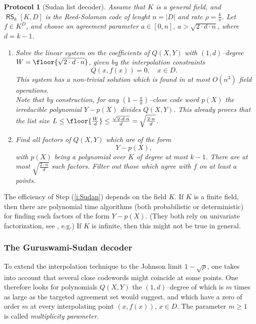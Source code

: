 \documentclass[11pt]{article}
\newtheorem{protocol}[]{Protocol}
\theoremstyle{definition}
\theoremstyle{remark}
\DeclareMathOperator{\RS}{\mathsf{RS}}
\begin{document}
\begin{protocol}[Sudan list decoder] 
Assume that $K$ is a general field, and $\RS_k[K,D]$ is the Reed-Solomon code of lenght $n=|D|$ and rate $\rho=\frac{k}{n}$. 
Let $f\in K^D$, and choose an agreement parameter $a\in [0,n]$,
$a>\sqrt{2\cdot d \cdot n}$, where $d= k-1$.
\begin{enumerate}
\item 
Solve the linear system on the coefficients of $Q(X,Y)$ with $(1,d)$--degree $W = \floor{\sqrt{2\cdot d\cdot n}}$, given by the interpolation constraints
\[
Q(x,f(x)) = 0, \quad x\in D.
\]
This system has a non-trivial solution which is found in at most $O(n^3)$ field operations.
\\
{\tiny
Note that by construction, for any $\left(1-\frac{a}{n}\right)$--close code word $p(X)$ the irreducible polynomial $Y-p(X)$ divides $Q(X,Y)$.
This already proves that the list size $L \leq \floor{\frac{W}{d}} \leq \frac{\sqrt{2\cdot d\cdot n}}{d} = \sqrt{\frac{2\cdot n}{d}}$.
}

\item 
\label{i:Sudan}
Find all factors of $Q(X,Y)$ which are of the form
\[
Y-p(X),
\] 
with $p(X)$ being a polynomial over $K$ of degree at most $k-1$. 
There are at most $\sqrt{\frac{2\cdot n}{d}}$ such factors. 
Filter out those which agree with $f$ on at least $a$ points. 
\end{enumerate}
\end{protocol}

The efficiency of Step (\ref{i:Sudan}) depends on the field $K$. 
If $K$ is a finite field, then there are polynomial time algorithms (both probabilistic or deterministic) for finding such factors of the form $Y-p(X)$. (They both rely on univariate factorization, see \cite{ListDecodingBook}, e.g.) 
If $K$ is infinite, then this might not be true in general. 



\subsubsection{The Guruswami-Sudan decoder}

To extend the interpolation technique to the Johnson limit $1 - \sqrt{\rho}$, one takes into account that several close codewords might coincide at some points. 
One therefore looks for polynomials $Q(X,Y)$ the $(1,d)$--degree of which is $m$ times as large as the targeted agreement set would suggest, and which have a zero of order $m$ at every interpolating point $(x,f(x))$, $x\in D$. 
The parameter $m\geq 1$ is called \textit{multiplicity parameter}.
\end{document}
